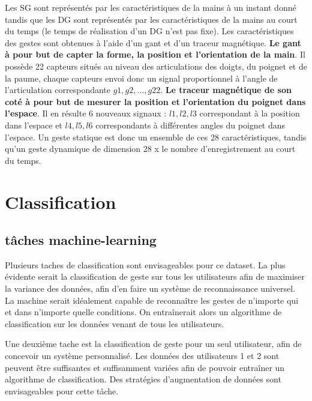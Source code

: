 \documentclass[12pt,a4paper,roman]{article}
\begin{document}
Les SG sont représentés par les caractéristiques de la mains à un instant donné tandis que les DG sont représentés par les caractéristiques de la mains au court du temps (le temps de réalisation d'un DG n'est pas fixe).
\newline
Les caractéristiques des gestes sont obtenues à l'aide d'un gant et d'un traceur magnétique. \textbf{Le gant à pour but de capter la forme, la position et l'orientation de la main}. Il possède 22 capteurs situés au niveau des articulations des doigts, du poignet et de la paume, chaque capteurs envoi donc un signal proportionnel à l'angle de l'articulation correspondante $g1, g2, ..., g22$.
\newline
\textbf{Le traceur magnétique de son coté à pour but de mesurer la position et l'orientation du poignet dans l'espace}. Il en résulte 6 nouveaux signaux : $l1, l2, l3$ correspondant à la position dans l'espace et $l4, l5, l6$ correspondants à différentes angles du poignet dans l'espace.
\newline
Un geste statique est donc un ensemble de ces 28 caractéristiques, tandis qu'un geste dynamique de dimension 28 x le nombre d'enregistrement au court du temps.

\section{Classification}
\subsection{tâches machine-learning}
Plusieurs taches de classification sont envisageables pour ce dataset. La plus évidente serait la classification de geste sur tous les utilisateurs afin de maximiser la variance des données, afin d'en faire un système de reconnaissance universel. La machine serait idéalement capable de reconnaître les gestes de n'importe qui et dans n'importe quelle conditions. On entraînerait alors un algorithme de classification sur les données venant de tous les utilisateurs.
\vspace{0.1cm}

Une deuxième tache est la classification de geste pour un seul utilisateur, afin de concevoir un système personnalisé. Les données des utilisateurs 1 et 2 sont peuvent être suffisantes et suffisamment variées afin de pouvoir entraîner un algorithme de classification. Des stratégies d'augmentation de données sont envisageables pour cette tâche.
\vspace{0.1cm}
\end{document}

